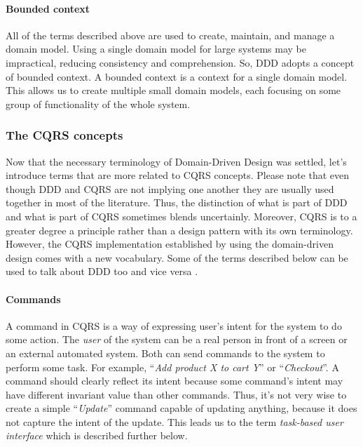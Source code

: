 \documentclass{book}
\begin{document}
\paragraph{Bounded context}\label{bounded-context}

All of the terms described above are used to create, maintain, and
manage a domain model. Using a single domain model for large systems may
be impractical, reducing consistency and comprehension. So, DDD adopts a
concept of bounded context. A bounded context is a context for a single
domain model. This allows us to create multiple small domain models,
each focusing on some group of functionality of the whole system.

\subsubsection{The CQRS concepts}\label{the-cqrs-concepts}

Now that the necessary terminology of Domain-Driven Design was settled,
let's introduce terms that are more related to CQRS concepts. Please
note that even though DDD and CQRS are not implying one another they are
usually used together in most of the literature. Thus, the distinction
of what is part of DDD and what is part of CQRS sometimes blends
uncertainly. Moreover, CQRS is to a greater degree a principle rather
than a design pattern with its own terminology. However, the CQRS
implementation established by using the domain-driven design comes with
a new vocabulary. Some of the terms described below can be used to talk
about DDD too and vice versa \cite{ddd-terms}.

\paragraph{Commands}\label{commands}

A command in CQRS is a way of expressing user's intent for the system to
do some action. The \emph{user} of the system can be a real person in
front of a screen or an external automated system. Both can send
commands to the system to perform some task. For example, ``\emph{Add
product X to cart Y}'' or ``\emph{Checkout}''. A command should clearly
reflect its intent because some command's intent may have different
invariant value than other commands. Thus, it's not very wise to create
a simple ``\emph{Update}'' command capable of updating anything, because
it does not capture the intent of the update. This leads us to the term
\emph{task-based user interface} which is described further below.
\end{document}
